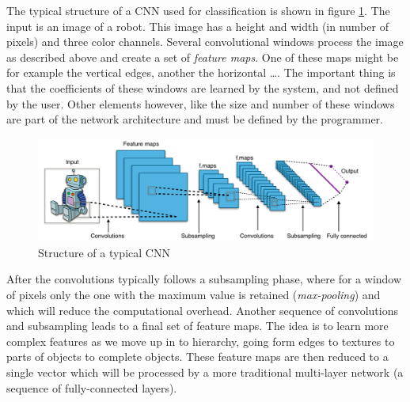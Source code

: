 The typical structure of a CNN used for classification is shown in figure \ref{fig:typical_cnn}. The input is an image of a robot. This image has a height and width (in number of pixels) and three color channels. Several convolutional windows process the image as described above and create a set of \emph{feature maps}. One of these maps might be for example the vertical edges, another the horizontal \ldots. The important thing is that the coefficients of these windows are learned by the system, and not defined by the user. Other elements however, like the size and number of these windows are part of the network architecture and must be defined by the programmer. \\

\begin{figure}[htp]
    \centering
    \includegraphics[width=14cm]{images/typical_cnn.png}
    \caption{Structure of a typical CNN}
    \label{fig:typical_cnn}
\end{figure}

After the convolutions typically follows a subsampling phase, where for a window of pixels only the one with the maximum value is retained (\emph{max-pooling}) and which will reduce the computational overhead. Another sequence of convolutions and subsampling leads to a final set of feature maps. The idea is to learn more complex features as we move up in to hierarchy, going form edges to textures to parts of objects to complete objects. These feature maps are then reduced to a single vector which will be processed by a more traditional multi-layer network (a sequence of fully-connected layers).\\

